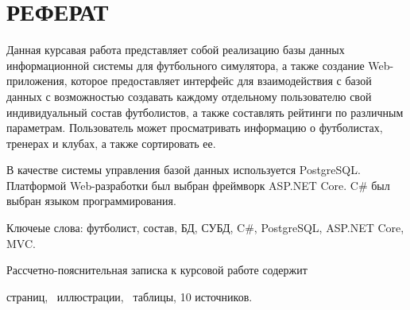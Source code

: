 \chapter*{РЕФЕРАТ}

Данная курсавая работа представляет собой реализацию базы данных информационной системы для футбольного симулятора, а также создание Web-приложения, которое предоставляет интерфейс для взаимодействия с базой данных с возможностью создавать каждому отдельному пользователю свой индивидуальный состав футболистов, а также составлять рейтинги по различным параметрам. Пользователь может просматривать информацию о футболистах, тренерах и клубах, а также сортировать ее.

В качестве системы управления базой данных используется PostgreSQL. Платформой Web-разработки был выбран фреймворк ASP.NET Core. C\# был выбран языком программирования.

Ключеые слова: футболист, состав, БД, СУБД, C\#, PostgreSQL, ASP.NET Core, MVC.

Рассчетно-пояснительная записка к курсовой работе содержит \begin{NoHyper}\pageref{LastPage}\end{NoHyper} страниц, \totfig~иллюстрации, \tottab~таблицы, 10 источников. 
